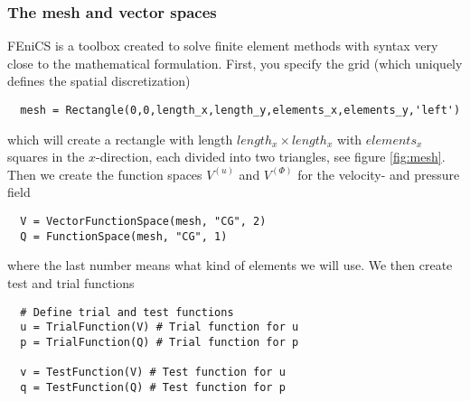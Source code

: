 \documentclass[a4paper,10pt]{article}
\renewcommand{\(}{\left(}
\renewcommand{\)}{\right)}
\begin{document}
\subsubsection{The mesh and vector spaces}
FEniCS is a toolbox created to solve finite element methods with syntax very close to the mathematical formulation. First, you specify the grid (which uniquely defines the spatial discretization)
\begin{lstlisting}
  mesh = Rectangle(0,0,length_x,length_y,elements_x,elements_y,'left')
\end{lstlisting}
which will create a rectangle with length $length_x\times length_x$ with $elements_x$ squares in the $x$-direction, each divided into two triangles, see figure \ref{fig:mesh}. Then we create the function spaces $V^{(u)}$ and $V^{(\Phi)}$ for the velocity- and pressure field
\begin{lstlisting}
  V = VectorFunctionSpace(mesh, "CG", 2)
  Q = FunctionSpace(mesh, "CG", 1)
\end{lstlisting}
where the last number means what kind of elements we will use. We then create test and trial functions 
\begin{lstlisting}
  # Define trial and test functions
  u = TrialFunction(V) # Trial function for u
  p = TrialFunction(Q) # Trial function for p

  v = TestFunction(V) # Test function for u
  q = TestFunction(Q) # Test function for p
\end{lstlisting}
\end{document}
